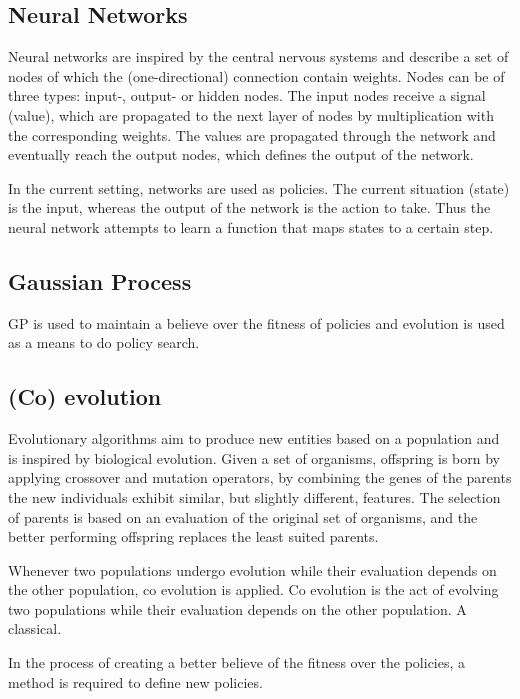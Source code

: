 \subsection{Neural Networks}
Neural networks are inspired by the central nervous systems and describe a set of nodes of which the (one-directional) connection contain weights. Nodes can be of three types: input-, output- or hidden nodes. The input nodes receive a signal (value), which are propagated to the next layer of nodes by multiplication with the corresponding weights. The values are propagated through the network and eventually reach the output nodes, which defines the output of the network. 

In the current setting, networks are used as policies. The current situation (state) is the input, whereas the output of the network is the action to take. Thus the neural network attempts to learn a function that maps states to a certain step.

\subsection{Gaussian Process}

GP is used to maintain a believe over the fitness of policies and evolution is used as a means to do policy search.

\subsection{(Co) evolution}
Evolutionary algorithms aim to produce new entities based on a population and is inspired by biological evolution. Given a set of organisms, offspring is born by applying crossover and mutation operators, by combining the genes of the parents the new individuals exhibit similar, but slightly different, features. The selection of parents is based on an evaluation of the original set of organisms, and the better performing offspring replaces the least suited parents. 

Whenever two populations undergo evolution while their evaluation depends on the other population, co evolution is applied. 
Co evolution is the act of evolving two populations while their evaluation depends on the other population. A classical.

In the process of creating a better believe of the fitness over the policies, a method is required to define new policies.

